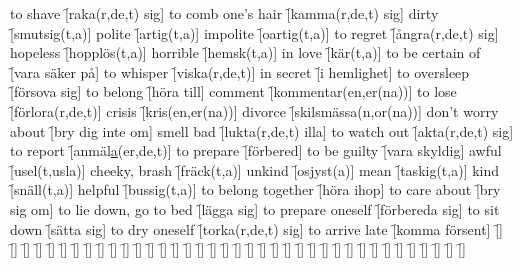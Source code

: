 \begin{questions}
\begin{multicols}{2}
        \question to shave \f[raka(r,de,t) sig]
        \question to comb one's hair \f[kamma(r,de,t) sig]
        \question dirty \f[smutsig(t,a)]
        \question polite \f[artig(t,a)]
        \question impolite \f[oartig(t,a)]
        \question to regret \f[ångra(r,de,t) sig]
        \question hopeless \f[hopplös(t,a)]
        \question horrible \f[hemsk(t,a)]
        \question in love \f[kär(t,a)]
        \question to be certain of \f[vara säker på]
        \question to whisper \f[viska(r,de,t)]
        \question in secret \f[i hemlighet]
        \question to oversleep \f[försova sig]
        \question to belong \f[höra till]
        \question comment \f[kommentar(en,er(na))]
        \question to lose \f[förlora(r,de,t)]
        \question crisis \f[kris(en,er(na))]
        \question divorce \f[skilsmässa(n,or(na))]
        \question don't worry about \f[bry dig inte om]
        \question smell bad \f[lukta(r,de,t) illa]
        \question to watch out \f[akta(r,de,t) sig]
        \question to report \f[anmäl\underline{a}(er,de,t)]
        \question to prepare \f[förbered]
        \question to be guilty \f[vara skyldig]
        \question awful \f[usel(t,usla)]
        \question cheeky, brash \f[fräck(t,a)]
        \question unkind \f[osjyst(a)]
        \question mean \f[taskig(t,a)]
        \question kind \f[snäll(t,a)]
        \question helpful \f[bussig(t,a)]
        \question to belong together \f[höra ihop]
        \question to care about \f[bry sig om]
        \question to lie down, go to bed \f[lägga sig]
        \question to prepare oneself \f[förbereda sig]
        \question to sit down \f[sätta sig]
        \question to dry oneself \f[torka(r,de,t) sig]
        \question to arrive late \f[komma försent]
        \question  \f[]
        \question \f[]
        \question \f[]
        \question \f[]
        \question \f[]
        \question \f[]
        \question \f[]
        \question \f[]
        \question \f[]
        \question \f[]
        \question \f[]
        \question \f[]
        \question \f[]
        \question \f[]
        \question \f[]
        \question \f[]
        \question \f[]
        \question \f[]
        \question \f[]
        \question \f[]
        \question \f[]
        \question \f[]
        \question \f[]
        \question \f[]
        \question \f[]
        \question \f[]
        \question \f[]
        \question \f[]
        \question \f[]
        \question \f[]
        \question \f[]
        \question \f[]
        \question \f[]
        \question \f[]
        \question \f[]
        \question \f[]
        \question \f[]
        \question \f[]

\end{multicols}
\end{questions}
